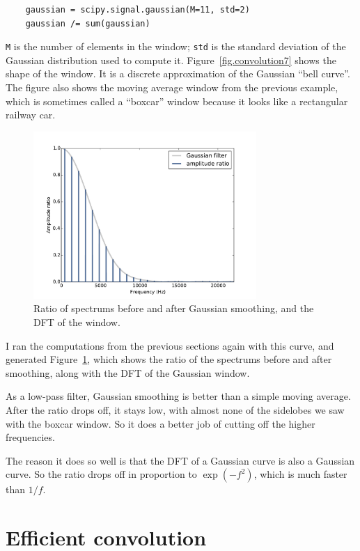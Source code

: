 \documentclass[12pt]{book}
\begin{document}
\begin{verbatim}
    gaussian = scipy.signal.gaussian(M=11, std=2)
    gaussian /= sum(gaussian)
\end{verbatim}

{\tt M} is the number of elements in the window; {\tt std}
is the standard deviation of the Gaussian distribution used to
compute it.  Figure~\ref{fig.convolution7} shows the shape
of the window.  It is a discrete approximation of the Gaussian
``bell curve''.  The figure also shows the moving average window
from the previous example, which is sometimes called a
``boxcar'' window because it looks like a rectangular railway car.

\begin{figure}
\centerline{\includegraphics[height=2.5in]{figs/convolution8.pdf}}
\caption{Ratio of spectrums before and after Gaussian smoothing, and
  the DFT of the window.}
\label{fig.convolution8}
\end{figure}

I ran the computations from the previous sections again
with this curve, and generated Figure~\ref{fig.convolution8},
which shows the ratio of the spectrums before and after
smoothing, along with the DFT of the Gaussian window. 

As a low-pass filter, Gaussian smoothing is better than a simple
moving average.  After the ratio drops off, it stays low, with almost
none of the sidelobes we saw with the boxcar window.  So it does a
better job of cutting off the higher frequencies.

The reason it does so well is that the DFT of a Gaussian curve is also a
Gaussian curve.  So the ratio drops off in proportion to $\exp(-f^2)$,
which is much faster than $1/f$.


\section{Efficient convolution}
\label{effconv}
\end{document}

